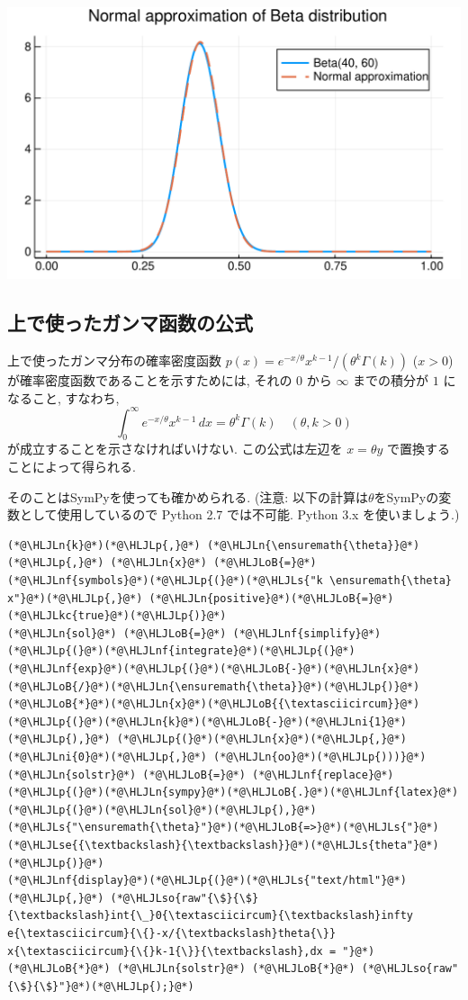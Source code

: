 \documentclass[12pt,a4paper,xelatex,ja=standard]{bxjsarticle}
\newcommand{\HLJLkc}[1]{\textcolor[RGB]{59,151,46}{\textit{#1}}}
\newcommand{\HLJLn}[1]{#1}
\newcommand{\HLJLnf}[1]{\textcolor[RGB]{66,102,213}{#1}}
\newcommand{\HLJLs}[1]{\textcolor[RGB]{201,61,57}{#1}}
\newcommand{\HLJLse}[1]{\textcolor[RGB]{59,151,46}{#1}}
\newcommand{\HLJLso}[1]{\textcolor[RGB]{201,61,57}{#1}}
\newcommand{\HLJLni}[1]{\textcolor[RGB]{59,151,46}{#1}}
\newcommand{\HLJLoB}[1]{\textcolor[RGB]{102,102,102}{\textbf{#1}}}
\newcommand{\HLJLp}[1]{#1}
\begin{document}
\begin{center}
\includegraphics[width=0.8\linewidth]{figures/テスト_4_1.pdf}
\end{center}

\subsection{上で使ったガンマ函数の公式}
上で使ったガンマ分布の確率密度函数 $p(x)=e^{-x/\theta}x^{k-1}/(\theta^k\Gamma(k))$ ($x>0$) が確率密度函数であることを示すためには, それの $0$ から $\infty$ までの積分が $1$ になること, すなわち, 
\[
\int_0^\infty e^{-x/\theta} x^{k-1}\,dx = \theta^k \Gamma(k)
\quad (\theta, k > 0)
\]
が成立することを示さなければいけない. この公式は左辺を $x=\theta y$ で置換することによって得られる.

そのことはSymPyを使っても確かめられる. (注意: 以下の計算は\ensuremath{\theta}をSymPyの変数として使用しているので Python 2.7 では不可能. Python 3.x を使いましょう.)


\begin{lstlisting}
(*@\HLJLn{k}@*)(*@\HLJLp{,}@*) (*@\HLJLn{\ensuremath{\theta}}@*)(*@\HLJLp{,}@*) (*@\HLJLn{x}@*) (*@\HLJLoB{=}@*) (*@\HLJLnf{symbols}@*)(*@\HLJLp{(}@*)(*@\HLJLs{"k \ensuremath{\theta} x"}@*)(*@\HLJLp{,}@*) (*@\HLJLn{positive}@*)(*@\HLJLoB{=}@*)(*@\HLJLkc{true}@*)(*@\HLJLp{)}@*)
(*@\HLJLn{sol}@*) (*@\HLJLoB{=}@*) (*@\HLJLnf{simplify}@*)(*@\HLJLp{(}@*)(*@\HLJLnf{integrate}@*)(*@\HLJLp{(}@*)(*@\HLJLnf{exp}@*)(*@\HLJLp{(}@*)(*@\HLJLoB{-}@*)(*@\HLJLn{x}@*)(*@\HLJLoB{/}@*)(*@\HLJLn{\ensuremath{\theta}}@*)(*@\HLJLp{)}@*)(*@\HLJLoB{*}@*)(*@\HLJLn{x}@*)(*@\HLJLoB{{\textasciicircum}}@*)(*@\HLJLp{(}@*)(*@\HLJLn{k}@*)(*@\HLJLoB{-}@*)(*@\HLJLni{1}@*)(*@\HLJLp{),}@*) (*@\HLJLp{(}@*)(*@\HLJLn{x}@*)(*@\HLJLp{,}@*) (*@\HLJLni{0}@*)(*@\HLJLp{,}@*) (*@\HLJLn{oo}@*)(*@\HLJLp{)))}@*)
(*@\HLJLn{solstr}@*) (*@\HLJLoB{=}@*) (*@\HLJLnf{replace}@*)(*@\HLJLp{(}@*)(*@\HLJLn{sympy}@*)(*@\HLJLoB{.}@*)(*@\HLJLnf{latex}@*)(*@\HLJLp{(}@*)(*@\HLJLn{sol}@*)(*@\HLJLp{),}@*) (*@\HLJLs{"\ensuremath{\theta}"}@*)(*@\HLJLoB{=>}@*)(*@\HLJLs{"}@*)(*@\HLJLse{{\textbackslash}{\textbackslash}}@*)(*@\HLJLs{theta"}@*)(*@\HLJLp{)}@*)
(*@\HLJLnf{display}@*)(*@\HLJLp{(}@*)(*@\HLJLs{"text/html"}@*)(*@\HLJLp{,}@*) (*@\HLJLso{raw"{\$}{\$}{\textbackslash}int{\_}0{\textasciicircum}{\textbackslash}infty e{\textasciicircum}{\{}-x/{\textbackslash}theta{\}} x{\textasciicircum}{\{}k-1{\}}{\textbackslash},dx = "}@*) (*@\HLJLoB{*}@*) (*@\HLJLn{solstr}@*) (*@\HLJLoB{*}@*) (*@\HLJLso{raw"{\$}{\$}"}@*)(*@\HLJLp{);}@*)
\end{lstlisting}
\end{document}
